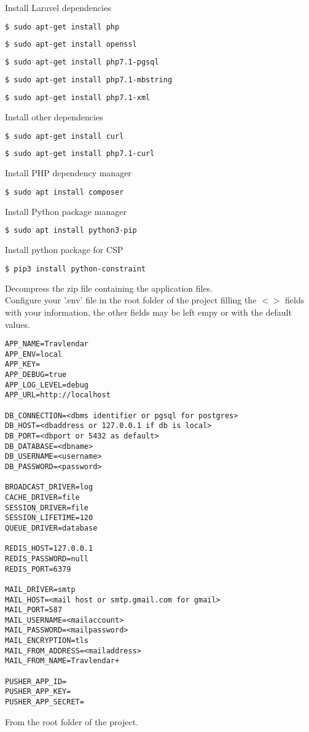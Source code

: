\noindent Install Laravel dependencies
\begin{lstlisting}[language=bash]
$ sudo apt-get install php
\end{lstlisting}
\begin{lstlisting}[language=bash]
$ sudo apt-get install openssl
\end{lstlisting}
\begin{lstlisting}[language=bash]
$ sudo apt-get install php7.1-pgsql
\end{lstlisting}
\begin{lstlisting}[language=bash]
$ sudo apt-get install php7.1-mbstring
\end{lstlisting}
\begin{lstlisting}[language=bash]
$ sudo apt-get install php7.1-xml
\end{lstlisting}
\bigskip
Install other dependencies
\begin{lstlisting}[language=bash]
$ sudo apt-get install curl
\end{lstlisting}
\begin{lstlisting}[language=bash]
$ sudo apt-get install php7.1-curl
\end{lstlisting}
Install PHP dependency manager
\begin{lstlisting}[language=bash]
$ sudo apt install composer
\end{lstlisting}
Install Python package manager
\begin{lstlisting}[language=bash]
$ sudo apt install python3-pip
\end{lstlisting}
Install python package for CSP
\begin{lstlisting}[language=bash]
$ pip3 install python-constraint
\end{lstlisting}

\bigskip
\noindent Decompress the zip file containing the application files.\\
Configure your '.env' file in the root folder of the project filling the $<>$ fields with your information, the other fields may be left empy or with the default values.
\bigskip
\begin{lstlisting}
APP_NAME=Travlendar
APP_ENV=local
APP_KEY=
APP_DEBUG=true
APP_LOG_LEVEL=debug
APP_URL=http://localhost

DB_CONNECTION=<dbms identifier or pgsql for postgres>
DB_HOST=<dbaddress or 127.0.0.1 if db is local>
DB_PORT=<dbport or 5432 as default>
DB_DATABASE=<dbname>
DB_USERNAME=<username>
DB_PASSWORD=<password>

BROADCAST_DRIVER=log
CACHE_DRIVER=file
SESSION_DRIVER=file
SESSION_LIFETIME=120
QUEUE_DRIVER=database

REDIS_HOST=127.0.0.1
REDIS_PASSWORD=null
REDIS_PORT=6379

MAIL_DRIVER=smtp
MAIL_HOST=<mail host or smtp.gmail.com for gmail>
MAIL_PORT=587
MAIL_USERNAME=<mailaccount>
MAIL_PASSWORD=<mailpassword>
MAIL_ENCRYPTION=tls
MAIL_FROM_ADDRESS=<mailaddress>
MAIL_FROM_NAME=Travlendar+

PUSHER_APP_ID=
PUSHER_APP_KEY=
PUSHER_APP_SECRET=
\end{lstlisting}
\bigskip
\noindent
From the root folder of the project.


